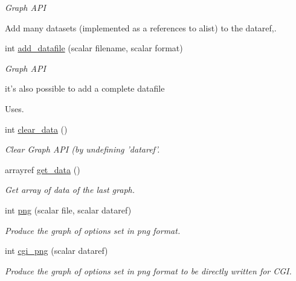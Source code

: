 \begin{DoxyCompactItemize}
\begin{DoxyCompactList}\small\item\em Graph API\par
 Add many datasets (implemented as a references to alist) to the dataref,. \item\end{DoxyCompactList}\item 
int \hyperlink{classChart_1_1Base_a57eedac06ec67f93222bbe1a2930b606}{add\_\-datafile} (scalar filename, scalar format)
\begin{DoxyCompactList}\small\item\em Graph API\par
 it's also possible to add a complete datafile\par
 Uses. \item\end{DoxyCompactList}\item 
int \hyperlink{classChart_1_1Base_a99372014f79c259968b77c93eaddaf1a}{clear\_\-data} ()
\begin{DoxyCompactList}\small\item\em Clear Graph API (by undefining 'dataref'. \item\end{DoxyCompactList}\item 
arrayref \hyperlink{classChart_1_1Base_abafa3dfccde44d267a6aea07ad2a1274}{get\_\-data} ()
\begin{DoxyCompactList}\small\item\em Get array of data of the last graph. \item\end{DoxyCompactList}\item 
int \hyperlink{classChart_1_1Base_ac6b44856256fb2aa1bb40ee716431028}{png} (scalar file, scalar dataref)
\begin{DoxyCompactList}\small\item\em Produce the graph of options set in png format. \item\end{DoxyCompactList}\item 
int \hyperlink{classChart_1_1Base_a887fdd48d80d348d6a38ad799356b0ec}{cgi\_\-png} (scalar dataref)
\begin{DoxyCompactList}\small\item\em Produce the graph of options set in png format to be directly written for CGI. \item\end{DoxyCompactList}\item 

\end{DoxyCompactItemize}

